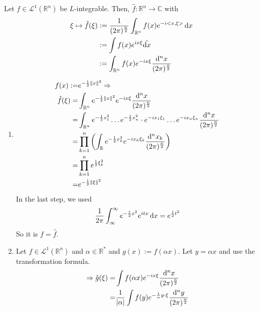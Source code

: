 \begin{definition}
    Let \(f \in \mathcal{L}^1 (\mathbb{R}^n) \) be \(L\)-integrable. Then, \(\hat{f}: \mathbb{R}^n \rightarrow \mathbb{C}\) with
    \begin{align}
        \xi \mapsto \hat{f} (\xi) &:= \frac{1}{(2\pi)^{\frac{n}{2}}} \int_{\mathbb{R}^n} f(x) e^{-i <x, \xi>} \mathop{}\!\mathrm{d} x \\
        &:= \int f(x) e^{ix\xi} \tilde{\mathop{}\!\mathrm{d} x} \\
        &:= \int_{\mathbb{R}^n} f(x) e^{-i x \xi} \frac{\mathop{}\!\mathrm{d}^n x}{(2\pi)^{\frac{n}{2}}} 
    \end{align}
\end{definition}
%
\begin{example}
    \begin{enumerate}
        \item
        \begin{align}
            f(x) :=& e^{-\frac{1}{2} \left\lVert x\right\rVert^2} \Rightarrow \\
            \hat{f}(\xi) =& \int_{\mathbb{R}^n} e^{-\frac{1}{2} \left\lVert x\right\rVert^2} e^{-i x \xi} \frac{\mathop{}\!\mathrm{d}^n x}{(2 \pi)^{\frac{n}{2}}} \\
            =& \int_{\mathbb{R}^n} e^{-\frac{1}{2} x_1^2} \dots e^{-\frac{1}{2} x_n^2} \cdot e^{-i x_1 \xi_1} \dots e^{-i x_n \xi_n} \frac{\mathop{}\!\mathrm{d}^n x}{(2 \pi)^{\frac{n}{2}}} \\
            =& \prod_{k = 1}^n \left( \int_\mathbb{R} e^{-\frac{1}{2} x_k^2} e^{-i x_k \xi_k} \frac{\mathop{}\!\mathrm{d}^n x_k}{(2 \pi)^{\frac{n}{2}}} \right) \\
            =& \prod_{k=1}^n e^{\frac{1}{2} \xi_k^2} \\
            =& e^{-\frac{1}{2} \left\lVert\xi\right\rVert^2}
        \end{align}
        In the last step, we used
        \begin{align}
            \frac{1}{2\pi} \int_\infty^\infty e^{-\frac{1}{2}x^2} e^{i t x} \mathop{}\!\mathrm{d} x = e^{\frac{1}{2}t^2}
        \end{align}
        So it is \(f = \hat{f}\).
        \item Let \(f \in \mathcal{L}^1 (\mathbb{R}^n)\) and \(\alpha \in \mathbb{R}^*\) and \(g(x) := f(\alpha x)\). Let \(y = \alpha x \) and use the transformation formula.
        \begin{align}
            \Rightarrow \hat{g}(\xi) =& \int f(\alpha x) e^{-i x \xi} \frac{\diff^n x}{(2\pi)^{\frac{n}{2}}} \\
            =& \frac{1}{|\alpha|} \int f(y) e^{-\frac{1}{\alpha}y \cdot \xi} \frac{\diff^n y}{(2 \pi)^{\frac{n}{2}}} \\

\end{align}
\end{enumerate}
\end{example}
